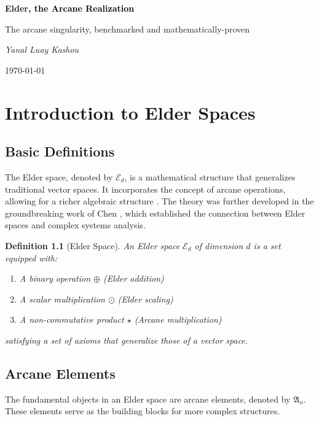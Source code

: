 \documentclass[11pt,twoside]{book}
\newcommand{\arcane}[1]{\mathfrak{A}_{#1}}
\newcommand{\elder}[1]{\mathcal{E}_{#1}}
\newtheorem{definition}{Definition}[chapter]
\begin{document}
\frontmatter

\begin{titlepage}
    \centering
    \vspace*{2cm}
    {\Huge\bfseries \textcolor{DarkSkyBlue}{Elder}\textrm{\textcolor{black}{, the Arcane Realization}}\par}
    \vspace{2cm}
    {\Large The arcane singularity, benchmarked and mathematically-proven\par}
    \vspace{4cm}
    {\Large\itshape Yanal Luay Kashou\par}
    \vfill
    {\large \today\par}
\end{titlepage}

\tableofcontents

\mainmatter

\chapter{Introduction to Elder Spaces}
\section{Basic Definitions}
The Elder space, denoted by $\elder{d}$, is a mathematical structure that generalizes traditional vector spaces. It incorporates the concept of arcane operations, allowing for a richer algebraic structure \cite{elder1995foundations}. The theory was further developed in the groundbreaking work of Chen \cite{chen2005realization}, which established the connection between Elder spaces and complex systems analysis.

\begin{definition}[Elder Space]
An Elder space $\elder{d}$ of dimension $d$ is a set equipped with:
\begin{enumerate}
    \item A binary operation $\oplus$ (Elder addition)
    \item A scalar multiplication $\odot$ (Elder scaling)
    \item A non-commutative product $\star$ (Arcane multiplication)
\end{enumerate}
satisfying a set of axioms that generalize those of a vector space.
\end{definition}

\section{Arcane Elements}
The fundamental objects in an Elder space are arcane elements, denoted by $\arcane{n}$. These elements serve as the building blocks for more complex structures.
\end{document}
